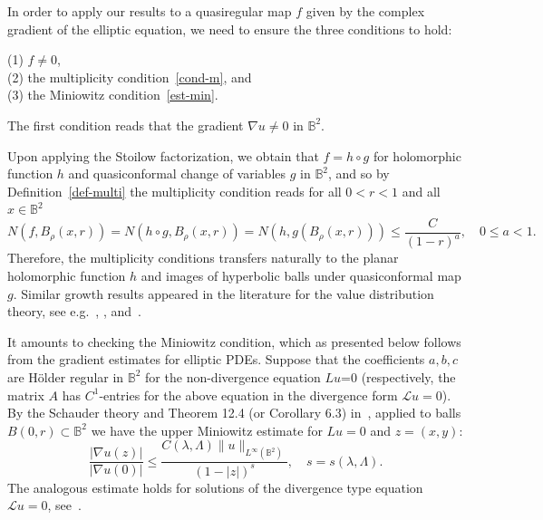 \documentclass[11pt,a4paper,reqno]{amsart}
\theoremstyle{definition}
\newcommand{\BB}{\mathbb{B}^2}
\numberwithin{komcounter}{section}
\begin{document}
In order to apply our results to a quasiregular map $f$ given by the complex gradient of the elliptic equation, we need to ensure the three conditions to hold:
\smallskip

\noindent (1) $f\not=0$,\\
\noindent (2) the multiplicity condition~\eqref{cond-m}, and \\
\noindent (3) the Miniowitz condition~\eqref{est-min}.
\smallskip

The first condition reads that the gradient $\nabla u\not= 0$ in $\BB$.

Upon applying the Stoilow factorization, we obtain that $f=h\circ g$ for holomorphic function $h$ and quasiconformal change of variables $g$ in $\BB$, and so by Definition~\ref{def-multi} the multiplicity condition reads for all $0<r<1$ and all $x\in \BB$
\begin{equation*}
 N(f, B_\rho(x, r))=N(h \circ g, B_\rho(x, r))=N(h, g(B_\rho(x, r)))\leq \frac{C}{(1-r)^a},\quad 0\leq a<1.
\end{equation*}
Therefore, the multiplicity conditions transfers naturally to the planar holomorphic function $h$ and images of hyperbolic balls under quasiconformal map $g$. Similar growth results appeared in the literature for the value distribution theory, see e.g.~\cite{Lo}, \cite[Chapter V]{Ric}, \cite[Chapter 11]{vuo2} and~\cite{Ak}.

It amounts to checking the Miniowitz condition, which as presented below follows from the gradient estimates for elliptic PDEs.
Suppose that the coefficients $a,b,c$ are H\"older regular in $\BB$ for the non-divergence equation $Lu$=0 (respectively, the matrix $A$ has $C^1$-entries for the above equation in the divergence form $\mathcal{L}u=0$). By the Schauder theory and Theorem 12.4 (or Corollary 6.3) in~\cite{gt}, applied to balls $B(0,r)\subset \BB$ we have the upper Miniowitz estimate for $Lu=0$ and $z=(x,y)$:
\begin{equation}\label{est-up-grad}
\frac{|\nabla u(z)|}{|\nabla u(0)|}\leq \frac{C(\lambda, \Lambda)\|u\|_{L^\infty(\BB)}}{(1-|z|)^{s}},\quad s=s(\lambda, \Lambda).
\end{equation}
The analogous estimate holds for solutions of the divergence type equation $\mathcal{L}u=0$, see~\cite[Theorem 13.1]{gt}.
\end{document}

